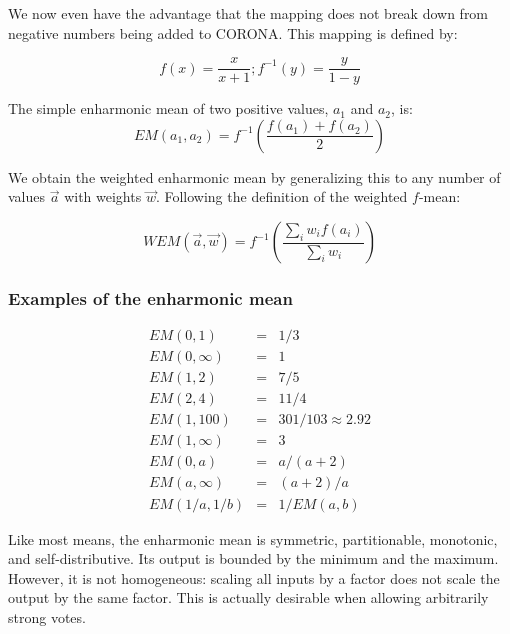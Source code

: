 \documentclass{article}
\begin{document}
We now even have the advantage that the mapping does not break down from
negative numbers being added to CORONA. This mapping is defined by:

$$f(x) = \frac{x}{x+1} ; f^{-1}(y) = \frac{y}{1-y}$$

The simple enharmonic mean of two positive values, $a_1$ and $a_2$, is:
\begin{equation}
EM(a_1, a_2) = f^{-1}\left(\frac{f(a_1) + f(a_2)}{2}\right)
\end{equation}

We obtain the weighted enharmonic mean by generalizing this to any number of
values $\vec{a}$ with weights $\vec{w}$. Following the definition of the
weighted $f$-mean:

\begin{equation}
WEM(\vec{a}, \vec{w}) = f^{-1}\left(
  \frac{ \sum_i w_i f(a_i) } { \sum_i w_i }
\right)
\end{equation}

\subsubsection{Examples of the enharmonic mean}
\begin{eqnarray*}
EM(0, 1) &=& 1/3\\
EM(0, \infty) &=& 1\\
EM(1, 2) &=& 7/5\\
EM(2, 4) &=& 11/4\\
EM(1, 100) &=& 301/103 \approx 2.92\\
EM(1, \infty) &=& 3\\
EM(0, a) &=& a/(a+2)\\
EM(a, \infty) &=& (a+2)/a\\
EM(1/a, 1/b) &=& 1/EM(a, b)
\end{eqnarray*}

Like most means, the enharmonic mean is symmetric, partitionable, monotonic,
and self-distributive. Its output is bounded by the minimum and the maximum.
However, it is not homogeneous: scaling all inputs by a factor does not scale
the output by the same factor. This is actually desirable when allowing
arbitrarily strong votes.
\end{document}
